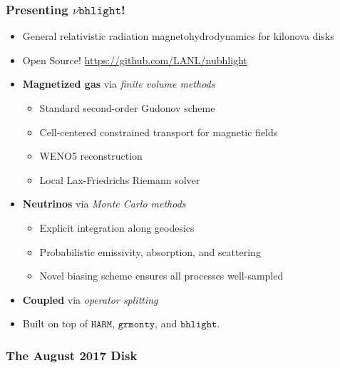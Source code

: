 \documentclass[]{beamer}
\begin{document}
\begin{frame}
  \frametitle{Presenting $\nu\texttt{bhlight}$!}
  \begin{itemize}
  \item General relativistic radiation magnetohydrodynamics for
    kilonova disks
  \item Open Source! {\color{blue}\url{https://github.com/LANL/nubhlight}}
  \item \textbf{Magnetized gas} via \textit{finite volume methods}
    \begin{itemize}
    \item Standard second-order Gudonov scheme
    \item Cell-centered constrained transport for magnetic fields
    \item WENO5 reconstruction
    \item Local Lax-Friedrichs Riemann solver
    \end{itemize}
  \item \textbf{Neutrinos} via \textit{Monte Carlo methods}
    \begin{itemize}
    \item Explicit integration along geodesics
    \item Probabilistic emissivity, absorption, and scattering
    \item Novel biasing scheme ensures all processes well-sampled
    \end{itemize}
  \item \textbf{Coupled} via \textit{operator splitting}
  \item Built on top of $\texttt{HARM}$, $\texttt{grmonty}$, and
    $\texttt{bhlight}$.
  \end{itemize}
\end{frame}

\begin{frame}
  \frametitle{The August 2017 Disk}
  \begin{center}
     \\
  \end{center}
\end{frame}
\end{document}
